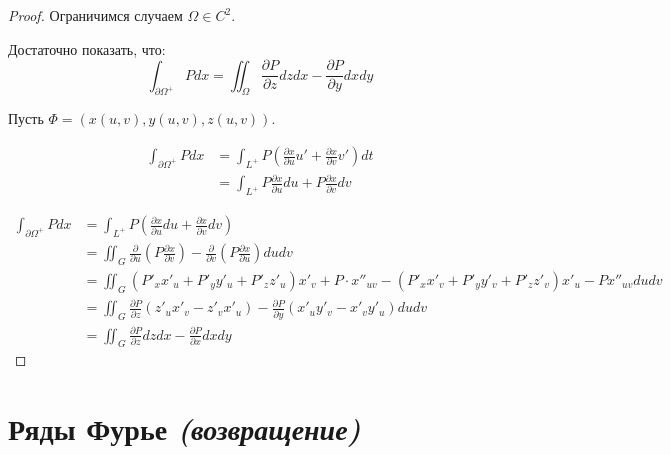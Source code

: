 \begin{proof}
    Ограничимся случаем \(\Omega \in C^2\). 

    Достаточно показать, что:
    \[\int_{\partial \Omega^{ +}} P dx = \iint_\Omega \frac{\partial P}{\partial z} dz dx - \frac{\partial P}{\partial y} dx dy\]

    Пусть \(\Phi = (x(u, v), y(u, v), z(u, v))\).

    \begin{align*}
        \int_{\partial \Omega^{ +}} P dx & =\int_{L^+} P \left( \frac{\partial x}{\partial u} u' + \frac{\partial x}{\partial v} v' \right) dt \\
                                         & =\int_{L^+} P \frac{\partial x}{\partial u} du + P \frac{\partial x}{\partial v} dv
    \end{align*}

    \begin{align*}
        \int_{\partial \Omega^{ +}} P dx & = \int_{L^{ +}} P \left( \frac{\partial x}{\partial u} du + \frac{\partial x}{\partial v} dv \right)                                                                    \\
                                         & = \iint_G \frac{\partial}{\partial u} \left( P \frac{\partial x}{\partial v} \right) - \frac{\partial}{\partial v} \left( P \frac{\partial x}{\partial u} \right) du dv \\
                                         & = \iint_G (P'_x x'_u + P'_y y'_u + P'_z z'_u)x'_v + P \cdot x''_{uv} - (P'_x x'_v + P'_y y'_v + P'_z z'_v) x'_u - P x''_{uv} du dv                                      \\
                                         & = \iint_G \frac{\partial P}{\partial z} (z'_u x'_v - z'_v x'_u) - \frac{\partial P}{\partial y} (x'_u y'_v - x'_v y'_u) du dv                                           \\
                                         & = \iint_G \frac{\partial P}{\partial z} dz dx - \frac{\partial P}{\partial x} dx dy
    \end{align*}
\end{proof}

\section{Ряды Фурье \textit{(возвращение)}}

